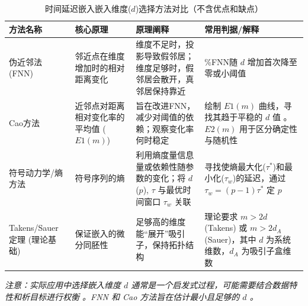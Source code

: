 \begin{table}[h!] %
    \centering %
    \caption{时间延迟嵌入嵌入维度($d$)选择方法对比（不含优点和缺点）}
    \label{tab:embedding_dimension_methods_no_pros_cons}
    \begin{tabular}{
        >{\raggedright\arraybackslash}m{3cm} %
        >{\raggedright\arraybackslash}m{4.5cm} %
        >{\raggedright\arraybackslash}m{5cm}  %
        >{\raggedright\arraybackslash}m{4cm}  %
        }
        \toprule %
        \textbf{方法名称}                        & \textbf{核心原理}             & \textbf{原理阐释}                                           & \textbf{常用判据/解释}                                                       \\
        \midrule %

        伪近邻法 (FNN) \cite{rhodes1997false}    & 邻近点在维度增加时的相对距离变化          & 维度不足时，投影导致假邻居；维度足够时，假邻居会散开，真邻居保持靠近                      & \%FNN随 $d$ 增加首次降至零或小阈值                                                 \\
        \addlinespace %

        Cao方法\cite{cao1997practical}         & 近邻点对距离相对变化率的平均值 ($E1(m)$) & 旨在改进FNN，减少对阈值的依赖；观察变化率何时稳定                              & 绘制 $E1(m)$ 曲线，寻找其趋于平稳的 $d$ 值 。$E2(m)$ 用于区分确定性与随机性                      \\
        \addlinespace

        符号动力学/熵方法\cite{matilla2021selection} & 符号序列的熵                    & 利用熵度量信息量或依赖性随参数的变化；将 $d$ ($p$), $τ$ 与最优时间窗口 $\tau_w$ 关联 & 寻找使熵最大化($\tau^*$)和最小化($\tau_w$)的延迟，通过 $\tau_w=(p-1)\tau^*$ 定 $p$       \\
        \addlinespace

        Takens/Sauer 定理 (理论基础)               & 保证嵌入的微分同胚性                & 足够高的维度能“展开”吸引子，保持拓扑结构                                   & 理论要求 $m > 2d$ (Takens) 或 $m > 2d_A$ (Sauer)，其中 $d$ 为系统维数，$d_A$ 为吸引子盒维数 \\

        \bottomrule %
    \end{tabular}
    \par %
    \vspace{0.5cm} %
    \textit{注意：实际应用中选择嵌入维度 $d$ 通常是一个启发式过程，可能需要结合数据特性和析目标进行权衡 。FNN 和 Cao 方法旨在估计最小且足够的 $d$ 。}
\end{table}
